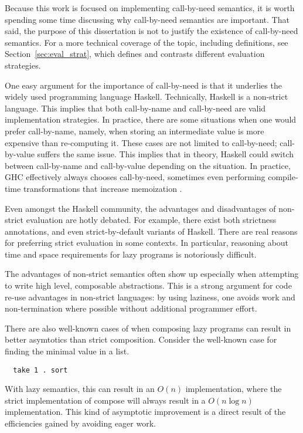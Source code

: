 Because this work is focused on implementing call-by-need semantics, it is worth
spending some time discussing why call-by-need semantics are important. That
said, the purpose of this dissertation is not to justify the existence of
call-by-need semantics. For a more technical coverage of the topic, including
definitions, see Section~\ref{sec:eval_strat}, which defines and contrasts
different evaluation strategies.

One easy argument for the importance of call-by-need is that it underlies the
widely used programming language Haskell. Technically, Haskell is a non-strict
language.  This implies that both call-by-name and call-by-need are valid
implementation strategies. In practice, there are some situations when one would
prefer call-by-name, namely, when storing an intermediate value is more
expensive than re-computing it. These cases are not limited to call-by-need;
call-by-value suffers the same issue.  This implies that in theory, Haskell
could switch between call-by-name and call-by-value depending on the situation.
In practice, GHC effectively always chooses call-by-need, sometimes even
performing compile-time transformations that increase memoization
\cite{jones96floating}.  

Even amongst the Haskell community, the advantages and disadvantages of
non-strict evaluation are hotly debated. For example, there exist both
strictness annotations, and even strict-by-default variants of Haskell. There
are real reasons for preferring strict evaluation in some contexts. In
particular, reasoning about time and space requirements for lazy programs is
notoriously difficult.  

The advantages of non-strict semantics often show up especially when attempting
to write high level, composable abstractions. This is a strong argument for code
re-use advantages in non-strict languages: by using laziness, one avoids work
and non-termination where possible without additional programmer effort.

There are also well-known cases of when composing lazy programs can result in
better asymtotics than strict composition. Consider the well-known case for
finding the minimal value in a list. 
\begin{verbatim}
  take 1 . sort
\end{verbatim}
With lazy semantics, this can result in an $O(n)$ implementation, where the
strict implementation of compose will always result in a $O(n \log n)$
implementation. This kind of asymptotic improvement is a direct result of the
efficiencies gained by avoiding eager work. 

